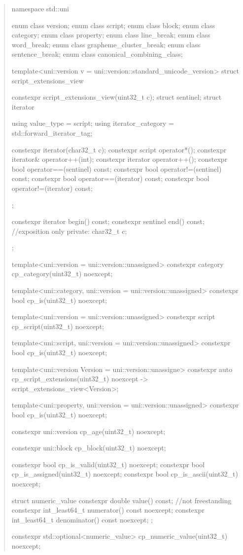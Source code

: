 \documentclass{wg21}
\begin{document}
\begin{quote}
\begin{colorblock}

namespace std::uni {

enum class version;
enum class script;
enum class block;
enum class category;
enum class property;
enum class line_break;
enum class word_break;
enum class grapheme_cluster_break;
enum class sentence_break;
enum class canonical_combining_class;


template<uni::version v = uni::version::standard_unicode_version>
struct script_extensions_view {
    constexpr script_extensions_view(uint32_t c);
    struct sentinel;
    struct iterator {
        using value_type = script;
        using iterator_category = std::forward_iterator_tag;

        constexpr iterator(char32_t c);
        constexpr script operator*();
        constexpr iterator& operator++(int);
        constexpr iterator operator++();
        constexpr bool operator==(sentinel) const;
        constexpr bool operator!=(sentinel) const;
        constexpr bool operator==(iterator) const;
        constexpr bool operator!=(iterator) const;
    };

    constexpr iterator begin() const;
    constexpr sentinel end() const;
    //exposition only
    private:
    char32_t c;
};


template<uni::version = uni::version::unassigned>
constexpr category cp_category(uint32_t) noexcept;

template<uni::category, uni::version = uni::version::unassigned>
constexpr bool cp_is(uint32_t) noexcept;

template<uni::version = uni::version::unassigned>
constexpr script cp_script(uint32_t) noexcept;

template<uni::script, uni::version = uni::version::unassigned>
constexpr bool cp_is(uint32_t) noexcept;

template<uni::version Version = uni::version::unassigne>
constexpr auto cp_script_extensions(uint32_t) noexcept
    -> script_extensions_view<Version>;

template<uni::property, uni::version = uni::version::unassigned>
constexpr bool cp_is(uint32_t) noexcept;

constexpr uni::version cp_age(uint32_t) noexcept;

constexpr uni::block cp_block(uint32_t) noexcept;

constexpr bool cp_is_valid(uint32_t) noexcept;
constexpr bool cp_is_assigned(uint32_t) noexcept;
constexpr bool cp_is_ascii(uint32_t) noexcept;

struct numeric_value {
    constexpr double value() const; //not freestanding
    constexpr int_least64_t numerator() const noexcept;
    constexpr int_least64_t denominator() const noexcept;
};

constexpr std::optional<numeric_value>
cp_numeric_value(uint32_t) noexcept;

}

\end{colorblock}
\end{quote}
\end{document}
